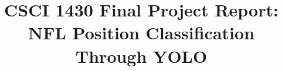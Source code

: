 %
%
%

%
%
%
%
% 
%
%
% 

\documentclass[10pt,twocolumn,letterpaper]{article}
 
\usepackage{cvpr}
\usepackage{times}
\usepackage{epsfig}
\usepackage{graphicx}
\usepackage{amsmath}
\usepackage{amssymb}
\usepackage{booktabs}
\usepackage{microtype}
\usepackage[numbered,framed]{matlab-prettifier}

\frenchspacing


\usepackage[pagebackref=true,breaklinks=true,letterpaper=true,colorlinks,bookmarks=false]{hyperref}

\cvprfinalcopy
\def\cvprPaperID{****}
\def\httilde{\mbox{\tt\raisebox{-.5ex}{\symbol{126}}}}
\ifcvprfinal\pagestyle{empty}\fi



\title{CSCI 1430 Final Project Report:\\NFL Position Classification Through YOLO}

